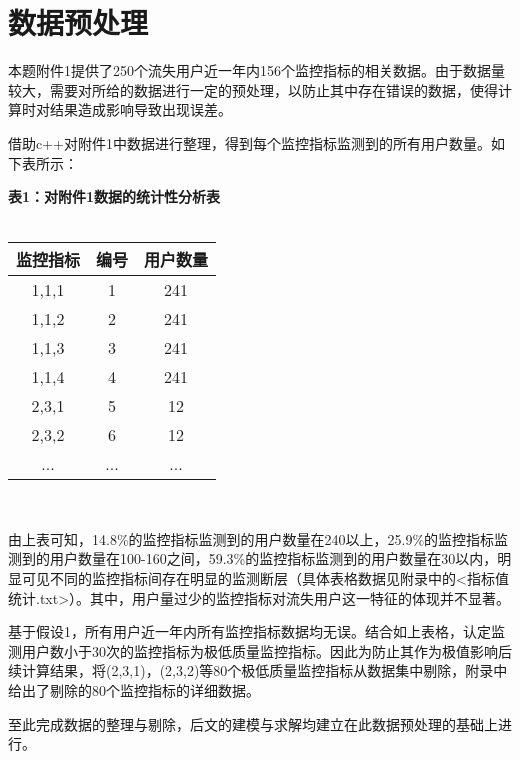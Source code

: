 \documentclass{ctexart}
\begin{document}
    \section{数据预处理}

        本题附件1提供了250个流失用户近一年内156个监控指标的相关数据。由于数据量较大，需要对所给的数据进行一定的预处理，以防止其中存在错误的数据，使得计算时对结果造成影响导致出现误差。

        借助c++对附件1中数据进行整理，得到每个监控指标监测到的所有用户数量。如下表所示：

        \begin{center}

            \textbf{表1：对附件1数据的统计性分析表}
            \\ \hspace*{\fill} \\

            \begin{tabular}{|c|c|c|}
                \hline
                \textbf{监控指标}&\textbf{编号}&\textbf{用户数量}\\
                \hline
                1,1,1&1&241\\
                1,1,2&2&241\\
                1,1,3&3&241\\
                1,1,4&4&241\\
                2,3,1&5&12\\
                2,3,2&6&12\\
                ...&...&...\\
    
                \hline
            \end{tabular}\\
        \end{center}

        由上表可知，14.8\%的监控指标监测到的用户数量在240以上，25.9\%的监控指标监测到的用户数量在100-160之间，59.3\%的监控指标监测到的用户数量在30以内，明显可见不同的监控指标间存在明显的监测断层（具体表格数据见附录中的<指标值统计.txt>）。其中，用户量过少的监控指标对流失用户这一特征的体现并不显著。

        基于假设1，所有用户近一年内所有监控指标数据均无误。结合如上表格，认定监测用户数小于30次的监控指标为极低质量监控指标。因此为防止其作为极值影响后续计算结果，将(2,3,1)，(2,3,2)等80个极低质量监控指标从数据集中剔除，附录中给出了剔除的80个监控指标的详细数据。

        至此完成数据的整理与剔除，后文的建模与求解均建立在此数据预处理的基础上进行。
\end{document}
